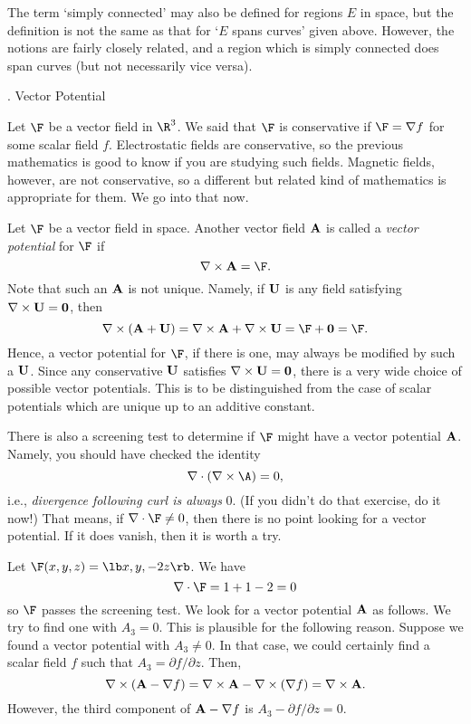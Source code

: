 The term `simply connected' may also be defined for regions $E$ in
space, but the definition is not the same
as that for `$E$ spans curves' given above. 
However, the notions are fairly closely related, and a region which
is simply connected does span curves (but not necessarily vice versa).
\bigskip

\bigskip
{}
\head \sn. Vector Potential \endhead

Let $\F$ be a vector field in $\R^3$.  We said that $\F$
is conservative if $\F = \nabla f$ for some scalar field
$f$.  Electrostatic fields are conservative, so the previous
mathematics is good to know if you are studying such fields.
Magnetic fields, however, are not conservative, so a different
but related kind of mathematics is appropriate for them.
We go into that now.

Let $\F$ be a vector field in space.  Another vector field
$\bold A$ is called a {\it vector potential\/} for $\F$
if 
$$
  \nabla\times\bold A = \F.
$$
%
%
Note that such an $\bold A$ is not unique.  Namely,
if $\bold U$ is any field satisfying $\nabla\times\bold U = \bold 0$,
then
$$
   \nabla\times(\bold A + \bold U) =
   \nabla\times\bold A +\nabla\times\bold U =\F + \bold 0 = \F.
$$
Hence, a vector potential for $\F$, if there is one, may always
be modified by such a $\bold U$.   Since any conservative
$\bold U$ satisfies $\nabla\times\bold U = \bold 0$, there
is a very wide choice of possible vector potentials.  This
is to be distinguished from the case of scalar potentials which
are unique up to an additive constant.

There is also a screening test to determine if $\F$ might
have a vector potential $\bold A$.  Namely, you should have
checked the identity
$$
  \nabla\cdot(\nabla\times\A) = 0,
$$
i.e.,  {\it divergence following curl is always\/} 0.  (If you
didn't do that exercise, do it now!)   That means, if 
$\nabla\cdot\F \not= 0$, then there is no point looking for
a vector potential.  If it does vanish, then it is worth
a try.

\nextex
{}   Let $\F(x,y,z) = \lb x, y, -2z \rb$.
We have
$$
\nabla\cdot\F = 1 + 1 -2 = 0
$$
so $\F$ passes the screening test.  We look for a vector
potential $\bold A$ as follows.  We try to find one with
$A_3 = 0$.  This is plausible for the following reason.
Suppose we found a vector potential with $A_3 \not= 0$.
In that case, we could certainly find a scalar field $f$
such that $A_3 = \partial f/\partial z$.  Then,
$$
\nabla\times(\bold A - \nabla f) = 
    \nabla\times\bold A - \nabla\times(\nabla f) = \nabla\times\bold A.
$$
However, the third component of $\bold A - \nabla f$ is
$A_3 - \partial f/\partial z = 0$.

